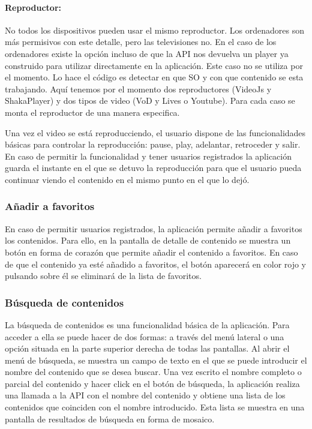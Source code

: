 \paragraph{Reproductor:} No todos los dispositivos pueden usar el mismo reproductor. Los ordenadores son más permisivos con este detalle, pero las televisiones no. En 
el caso de los ordenadores existe la opción incluso de que la API nos devuelva un player ya construido para utilizar directamente en la aplicación. Este caso no se utiliza
por el momento. Lo hace el código es detectar en que SO y con que contenido se esta trabajando. Aquí tenemos por el momento dos reproductores (VideoJs y ShakaPlayer) y dos 
tipos de video (VoD y Lives o Youtube). Para cada caso se monta el reproductor de una manera especifica. 


Una vez el video se está reproducciendo, el usuario dispone de las funcionalidades básicas para controlar la reproducción: pause, play, adelantar, retroceder y salir. 
En caso de permitir la funcionalidad y tener usuarios registrados la aplicación guarda el instante en el que se detuvo la reproducción para que el usuario pueda
continuar viendo el contenido en el mismo punto en el que lo dejó.

\subsubsection{Añadir a favoritos}
\label{sec:anadir_favoritos}

En caso de permitir usuarios registrados, la aplicación permite añadir a favoritos los contenidos. Para ello, en la pantalla de detalle de contenido se muestra un 
botón en forma de corazón que permite añadir el contenido a favoritos. En caso de que el contenido ya esté añadido a favoritos, el botón aparecerá en color rojo y pulsando
sobre él se eliminará de la lista de favoritos.

\subsubsection{Búsqueda de contenidos}
\label{sec:busqueda_contenidos}

La búsqueda de contenidos es una funcionalidad básica de la aplicación. Para acceder a ella se puede hacer de dos formas: a través del menú lateral o una opción 
situada en la parte superior derecha de todas las pantallas. Al abrir el menú de búsqueda, se muestra un campo de texto en el que se puede introducir el nombre del
contenido que se desea buscar. Una vez escrito el nombre completo o parcial del contenido y hacer click en el botón de búsqueda, la aplicación realiza una llamada a la
API con el nombre del contenido y obtiene una lista de los contenidos que coinciden con el nombre introducido. Esta lista se muestra en una pantalla de resultados de
búsqueda en forma de mosaico. 


